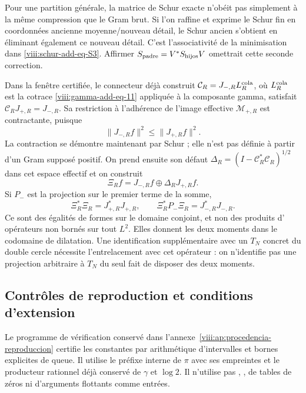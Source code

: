 Pour une partition générale, la matrice de Schur exacte n'obéit pas simplement
à la même compression que le Gram brut. Si l'on raffine et exprime le
Schur fin en coordonnées ancienne moyenne/nouveau détail, le Schur
ancien s'obtient en éliminant également ce nouveau détail. C'est
l'associativité de la minimisation dans \eqref{viii:schur-add-eq-S3}. Affirmer
\(S_{\rm padre}=V^*S_{\rm hijos}V\) omettrait cette seconde correction.

Dans la fenêtre certifiée, le connecteur déjà construit \(\mathcal C_R=J_{-,R}L_R^{\rm cola}\), où \(L_R^{\rm cola}\) est la cotrace \eqref{viii:gamma-add-eq-11} appliquée à la composante gamma, satisfait \(\mathcal C_RJ_{+,R}=J_{-,R}\). Sa restriction à l'adhérence de l'image effective \(\mathcal M_{+,R}\) est contractante, puisque
\begin{equation}
\|J_{-,R}f\|^2\leq\|J_{+,R}f\|^2.
\label{viii:schur-add-display-31}
\end{equation}
La contraction se démontre maintenant par Schur ; elle n'est pas définie à
partir d'un Gram supposé positif. On prend ensuite son défaut
\(\Delta_R=(I-\mathcal C_R^*\mathcal C_R)^{1/2}\) dans cet espace
effectif et on construit
\begin{equation}
\Xi_Rf=J_{-,R}f\oplus\Delta_RJ_{+,R}f.
\label{viii:schur-add-display-32}
\end{equation}
Si \(P_-\) est la projection sur le premier terme de la somme,
\begin{equation}
\Xi_R^*\Xi_R=J_{+,R}^*J_{+,R},\qquad
\Xi_R^*P_-\Xi_R=J_{-,R}^*J_{-,R}.
\label{viii:schur-add-display-33}
\end{equation}
Ce sont des égalités de formes sur le domaine conjoint, et non des produits d'
opérateurs non bornés sur tout \(L^2\). Elles donnent les deux moments dans
le codomaine de dilatation. Une identification supplémentaire avec un
\(T_N\) concret du double cercle nécessite l'entrelacement
avec cet opérateur : on n'identifie pas une projection arbitraire à
\(T_N\) du seul fait de disposer des deux moments.

\subsection{Contrôles de reproduction et conditions d'extension}
\label{viii:schur-add-sub-411}

Le programme de vérification conservé dans l'annexe~\ref{viii:ap:procedencia-reproduccion} certifie les constantes par arithmétique d'intervalles et bornes explicites de queue. Il utilise le préfixe interne de \(\pi\) avec ses empreintes et le producteur rationnel déjà conservé de \(\gamma\) et \(\log2\). Il n'utilise pas \texttt{}, \texttt{}, de tables de zéros ni d'arguments flottants comme entrées.

